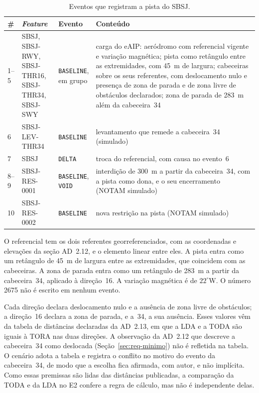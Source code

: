 \begin{table}[htbp]
    \centering
    \caption{Eventos que registram a pista do SBSJ.}
    \label{tab:eventos-sbsj}
    \begin{tabularx}{\linewidth}{l l l X}
        \toprule
        \# & \textit{Feature} & Evento & Conteúdo \\
        \midrule
        1--5 & \makecell[l]{SBSJ, SBSJ-RWY,\\ SBSJ-THR16,\\ SBSJ-THR34,\\ SBSJ-SWY} & \makecell[l]{\texttt{BASELINE},\\ em grupo} & carga do eAIP: aeródromo com referencial vigente e variação magnética; pista como retângulo entre as extremidades, com 45~m de largura; cabeceiras sobre os seus referentes, com deslocamento nulo e presença de zona de parada e de zona livre de obstáculos declarados; zona de parada de 283~m além da cabeceira~34 \\
        6 & SBSJ-LEV-THR34 & \texttt{BASELINE} & levantamento que remede a cabeceira~34 (simulado) \\
        7 & SBSJ & \texttt{DELTA} & troca do referencial, com causa no evento~6 \\
        8--9 & SBSJ-RES-0001 & \makecell[l]{\texttt{BASELINE},\\ \texttt{VOID}} & interdição de 300~m a partir da cabeceira~34, com a pista como dona, e o seu encerramento (NOTAM simulado) \\
        10 & SBSJ-RES-0002 & \texttt{BASELINE} & nova restrição na pista (NOTAM simulado) \\
        \bottomrule
    \end{tabularx}
    \par{}
\end{table}

O referencial tem os dois referentes georreferenciados, com as coordenadas e elevações da seção AD~2.12, e o elemento linear entre eles. A pista entra como um retângulo de 45~m de largura entre as extremidades, que coincidem com as cabeceiras. A zona de parada entra como um retângulo de 283~m a partir da cabeceira~34, aplicado à direção~16. A variação magnética é de $22^\circ$W. O número 2675 não é escrito em nenhum evento.

Cada direção declara deslocamento nulo e a ausência de zona livre de obstáculos; a direção~16 declara a zona de parada, e a~34, a sua ausência. Esses valores vêm da tabela de distâncias declaradas da AD~2.13, em que a LDA e a TODA são iguais à TORA nas duas direções. A observação da AD~2.12 que descreve a cabeceira~34 como deslocada (Seção~\ref{sec:req-minimo}) não é refletida na tabela. O cenário adota a tabela e registra o conflito no motivo do evento da cabeceira~34, de modo que a escolha fica afirmada, com autor, e não implícita. Como essas premissas são lidas das distâncias publicadas, a comparação da TODA e da LDA no E2 confere a regra de cálculo, mas não é independente delas.

